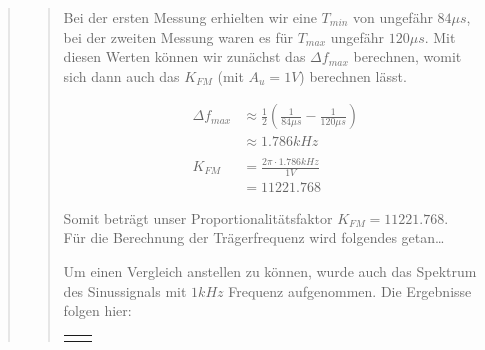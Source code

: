 \begin{quote}
\begin{quote}
        Bei der ersten Messung erhielten wir eine $T_{min}$ von ungefähr 
        $84\mu s$, bei der zweiten Messung waren es für $T_{max}$ ungefähr 
        $120\mu s$. Mit diesen Werten können wir zunächst das $\Delta f_{max}$
        berechnen, womit sich dann auch das $K_{FM}$ (mit $A_u = 1V$) berechnen
        lässt.
        
      \begin{equation*}
       \begin{split}
		\Delta f_{max} &\approx \frac{1}{2} (\frac{1}{84\mu s} - \frac{1}{120\mu s})\\
					   &\approx 1.786 kHz \\
		\\		
	    K_{FM} &= \frac{2 \pi \cdot 1.786 kHz}{1 V}\\
	    	   &= 11221.768    		
       \end{split}
     \end{equation*}
     
        
        Somit beträgt unser Proportionalitätsfaktor $K_{FM} = 11221.768$.\\
        
        Für die Berechnung der Trägerfrequenz wird folgendes getan\ldots 
        
        Um einen Vergleich anstellen zu können, wurde auch das Spektrum des
        Sinussignals mit $1 kHz$ Frequenz aufgenommen. Die Ergebnisse folgen
        hier:
        
                \begin{center}
            \begin{tabular}{ll}

            \hspace{-10em}
                \begin{minipage}{0.6\textwidth}


\end{minipage}
\end{tabular}
\end{center}
\end{quote}
\end{quote}
